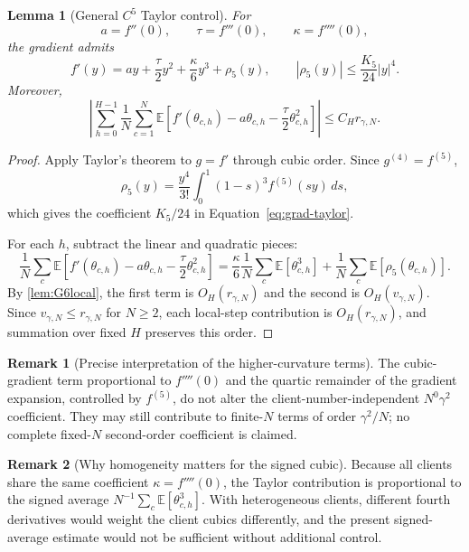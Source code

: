 \documentclass[11pt]{article}
\newtheorem{lemma}[lemma]{Lemma}
\theoremstyle{definition}
\newtheorem{remark}[remark]{Remark}
\newcommand{\E}{\mathbb{E}}
\newcommand{\remscale}{r_{\gamma,N}}
\newcommand{\fourthscale}{v_{\gamma,N}}
\begin{document}
\begin{lemma}[General $C^5$ Taylor control]
\label{lem:G7}
For
\[
  a=f''(0),\qquad \tau=f'''(0),\qquad \kappa=f''''(0),
\]
the gradient admits
\begin{equation}
\label{eq:grad-taylor}
  f'(y)=ay+\frac\tau2y^2+\frac\kappa6y^3+\rho_5(y),
  \qquad
  |\rho_5(y)|\le \frac{K_5}{24}|y|^4.
\end{equation}
Moreover,
\begin{equation}
\label{eq:G7}
  \left|
  \sum_{h=0}^{H-1}\frac1N\sum_{c=1}^N
  \E\left[
  f'(\theta_{c,h})-a\theta_{c,h}-\frac\tau2\theta_{c,h}^2
  \right]
  \right|
  \le C_H\remscale.
\end{equation}
\end{lemma}

\begin{proof}
Apply Taylor's theorem to $g=f'$ through cubic order. Since $g^{(4)}=f^{(5)}$,
\[
  \rho_5(y)=\frac{y^4}{3!}\int_0^1(1-s)^3 f^{(5)}(sy)\,ds,
\]
which gives the coefficient $K_5/24$ in Equation~\eqref{eq:grad-taylor}.

For each $h$, subtract the linear and quadratic pieces:
\[
  \frac1N\sum_c\E\left[
  f'(\theta_{c,h})-a\theta_{c,h}-\frac\tau2\theta_{c,h}^2
  \right]
  =\frac\kappa6\frac1N\sum_c\E[\theta_{c,h}^3]
   +\frac1N\sum_c\E[\rho_5(\theta_{c,h})].
\]
By \cref{lem:G6local}, the first term is $O_H(\remscale)$ and the second is $O_H(\fourthscale)$. Since $\fourthscale\le\remscale$ for $N\ge2$, each local-step contribution is $O_H(\remscale)$, and summation over fixed $H$ preserves this order.
\end{proof}

\begin{remark}[Precise interpretation of the higher-curvature terms]
The cubic-gradient term proportional to $f''''(0)$ and the quartic remainder of the gradient expansion, controlled by $f^{(5)}$, do not alter the client-number-independent $N^0\gamma^2$ coefficient. They may still contribute to finite-$N$ terms of order $\gamma^2/N$; no complete fixed-$N$ second-order coefficient is claimed.
\end{remark}

\begin{remark}[Why homogeneity matters for the signed cubic]
Because all clients share the same coefficient $\kappa=f''''(0)$, the Taylor contribution is proportional to the signed average $N^{-1}\sum_c\E[\theta_{c,h}^3]$. With heterogeneous clients, different fourth derivatives would weight the client cubics differently, and the present signed-average estimate would not be sufficient without additional control.
\end{remark}
\end{document}
